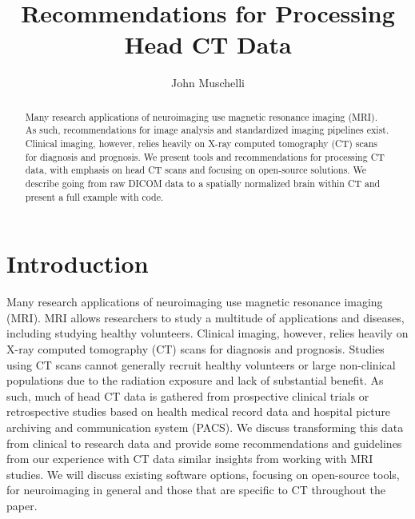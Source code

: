 \documentclass[]{elsarticle} %
\begin{document}
\begin{frontmatter}

  \title{Recommendations for Processing Head CT Data}
    \author[JHSPH]{John Muschelli}
  
      \address[JHSPH]{Johns Hopkins Bloomberg School of Public Health, Department of
Biostatistics, 615 N Wolfe St, Baltimore, MD, 21205}
    \address[JHMI]{Johns Hopkins Hospital, Department of Neurology, 601 N Caroline St,
Baltimore, MD 21205}
    \address[BIOS]{Brain Injury Outcomes, Johns Hopkins University, 750 East Pratt Street,
Baltimore, MD 21202}
  
  \begin{abstract}
  Many research applications of neuroimaging use magnetic resonance
  imaging (MRI). As such, recommendations for image analysis and
  standardized imaging pipelines exist. Clinical imaging, however, relies
  heavily on X-ray computed tomography (CT) scans for diagnosis and
  prognosis. We present tools and recommendations for processing CT data,
  with emphasis on head CT scans and focusing on open-source solutions. We
  describe going from raw DICOM data to a spatially normalized brain
  within CT and present a full example with code.
  \end{abstract}
  
 \end{frontmatter}

\hypertarget{introduction}{%
\section{Introduction}\label{introduction}}

Many research applications of neuroimaging use magnetic resonance
imaging (MRI). MRI allows researchers to study a multitude of
applications and diseases, including studying healthy volunteers.
Clinical imaging, however, relies heavily on X-ray computed tomography
(CT) scans for diagnosis and prognosis. Studies using CT scans cannot
generally recruit healthy volunteers or large non-clinical populations
due to the radiation exposure and lack of substantial benefit. As such,
much of head CT data is gathered from prospective clinical trials or
retrospective studies based on health medical record data and hospital
picture archiving and communication system (PACS). We discuss
transforming this data from clinical to research data and provide some
recommendations and guidelines from our experience with CT data similar
insights from working with MRI studies. We will discuss existing
software options, focusing on open-source tools, for neuroimaging in
general and those that are specific to CT throughout the paper.
\end{document}
